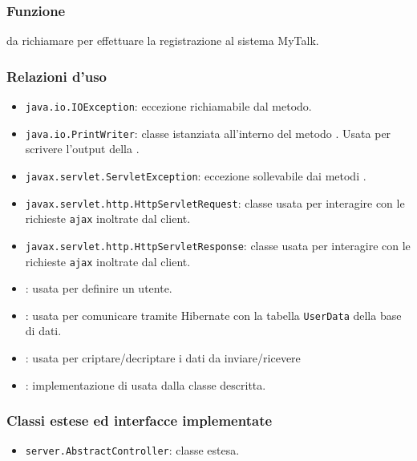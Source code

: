 
\subsubsection*{Funzione}
 da richiamare per effettuare la registrazione al sistema MyTalk.

\subsubsection*{Relazioni d'uso}
\begin{itemize}
	\item \texttt{java.io.IOException}: eccezione richiamabile dal metodo.
	\item \texttt{java.io.PrintWriter}: classe istanziata all'interno del metodo . Usata per scrivere l'output della .
	\item \texttt{javax.servlet.ServletException}: eccezione sollevabile dai metodi .
	\item \texttt{javax.servlet.http.HttpServletRequest}: classe usata per interagire con le richieste \texttt{ajax} inoltrate dal client.
	\item \texttt{javax.servlet.http.HttpServletResponse}: classe usata per interagire con le richieste \texttt{ajax} inoltrate dal client.
	\item {}: usata per definire un utente.
	\item {}: usata per comunicare tramite Hibernate con la tabella \texttt{UserData} della base di dati.
	\item {}: usata per criptare/decriptare i dati da inviare/ricevere
	\item {}: implementazione di  usata dalla classe descritta.
	
\end{itemize}

\subsubsection*{Classi estese ed interfacce implementate}
\begin{itemize}
	\item \texttt{server.AbstractController}: classe estesa.
\end{itemize}

